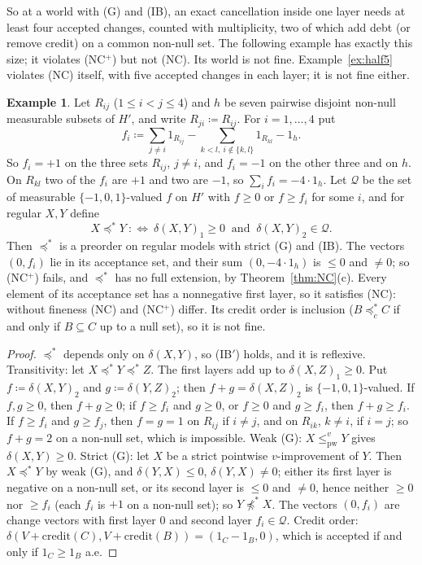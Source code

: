 \documentclass[11pt]{article}
\theoremstyle{definition}\newtheorem{definition}[theorem]{Definition}
\newtheorem{example}[theorem]{Example}
\theoremstyle{remark}\newtheorem{remark}[theorem]{Remark}
\newcommand{\cred}{\mathrm{credit}}
\newcommand{\pw}{\mathrm{pw}}
\begin{document}
So at a world with (G) and (IB), an exact cancellation inside one layer
needs at least four accepted changes, counted with multiplicity, two of
which add debt (or remove credit) on a common non-null set. The following
example has exactly this size; it violates (NC$^+$) but not (NC). Its world
is not fine. Example~\ref{ex:half5} violates (NC) itself, with five
accepted changes in each layer; it is not fine either.

\begin{example}\label{ex:K4}
Let $R_{ij}$ ($1\le i<j\le4$) and $h$ be seven pairwise disjoint non-null
measurable subsets of $H'$, and write $R_{ji}\coloneqq R_{ij}$. For
$i=1,\dots,4$ put
\[
 f_i\coloneqq\sum_{j\ne i}1_{R_{ij}}-\sum_{k<l,\ i\notin\{k,l\}}1_{R_{kl}}
 -1_h .
\]
So $f_i=+1$ on the three sets $R_{ij}$, $j\ne i$, and $f_i=-1$ on the other
three and on $h$. On $R_{kl}$ two of the $f_i$ are $+1$ and two are $-1$, so
$\sum_if_i=-4\cdot1_h$. Let $\mathcal Q$ be the set of measurable
$\{-1,0,1\}$-valued $f$ on $H'$ with $f\ge0$ or $f\ge f_i$ for some $i$, and
for regular $X,Y$ define
\[
 X\preceq^*Y\ :\Longleftrightarrow\ \delta(X,Y)_1\ge0\ \text{ and }\
 \delta(X,Y)_2\in\mathcal Q .
\]
Then $\preceq^*$ is a preorder on regular models with strict (G) and (IB).
The vectors $(0,f_i)$ lie in its acceptance set, and their sum
$(0,-4\cdot1_h)$ is $\le0$ and $\ne0$; so (NC$^+$) fails, and $\preceq^*$
has no full extension, by Theorem~\ref{thm:NC}(c). Every element of its
acceptance set has a nonnegative first layer, so it satisfies (NC): without
fineness (NC) and (NC$^+$) differ. Its credit order is inclusion
($B\preceq^*_cC$ if and only if $B\subseteq C$ up to a null set), so it is not
fine.
\end{example}
\begin{proof}
$\preceq^*$ depends only on $\delta(X,Y)$, so (IB$'$) holds, and it is
reflexive. Transitivity: let $X\preceq^*Y\preceq^*Z$. The first layers add
up to $\delta(X,Z)_1\ge0$. Put $f\coloneqq\delta(X,Y)_2$ and
$g\coloneqq\delta(Y,Z)_2$; then $f+g=\delta(X,Z)_2$ is $\{-1,0,1\}$-valued.
If $f,g\ge0$, then $f+g\ge0$; if $f\ge f_i$ and $g\ge0$, or $f\ge0$ and
$g\ge f_i$, then $f+g\ge f_i$. If $f\ge f_i$ and $g\ge f_j$, then $f=g=1$ on
$R_{ij}$ if $i\ne j$, and on $R_{ik}$, $k\ne i$, if $i=j$; so $f+g=2$ on a
non-null set, which is impossible. Weak (G): $X\le^v_\pw Y$ gives
$\delta(X,Y)\ge0$. Strict (G): let $X$ be a strict pointwise
$v$-improvement of $Y$. Then $X\preceq^*Y$ by weak (G), and
$\delta(Y,X)\le0$, $\delta(Y,X)\ne0$; either its first layer is negative on
a non-null set, or its second layer is $\le0$ and $\ne0$, hence neither
$\ge0$ nor $\ge f_i$ (each $f_i$ is $+1$ on a non-null set); so
$Y\not\preceq^*X$. The vectors $(0,f_i)$ are change
vectors with first layer $0$ and second layer $f_i\in\mathcal Q$. Credit
order: $\delta(V+\cred(C),V+\cred(B))=(1_C-1_B,0)$, which is accepted if and
only if $1_C\ge1_B$ a.e.
\end{proof}
\end{document}
